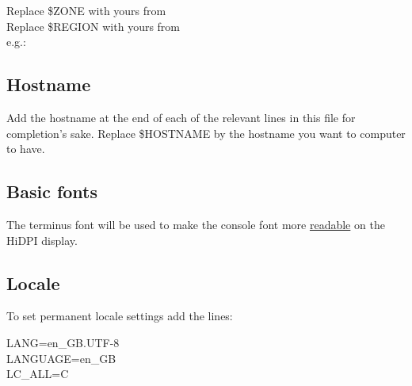 \begin{blocksection}
    Replace \textcolor{codekeyword1}{\$ZONE} with yours from \\
    Replace \textcolor{codekeyword1}{\$REGION} with yours from \\
    e.g.: 
\end{blocksection}

\subsection{Hostname}

\begin{blocksection}
    Add the hostname at the end of each of the relevant lines in this file for completion's sake. Replace \textcolor{codekeyword1}{\$HOSTNAME} by the hostname you want to computer to have.
\end{blocksection}

\subsection{Basic fonts}

\begin{blocksection}
    The terminus font will be used to make the console font more \href{https://wiki.archlinux.org/index.php/HiDPI#Linux_console}{readable} on the HiDPI display.
\end{blocksection}

\subsection{Locale}

\begin{blocksection}
    To set permanent locale settings add the lines:\\
    \begin{codeblock}
        LANG=en\_GB.UTF-8\\
        LANGUAGE=en\_GB\\
        LC\_ALL=C
    \end{codeblock}
\end{blocksection}

